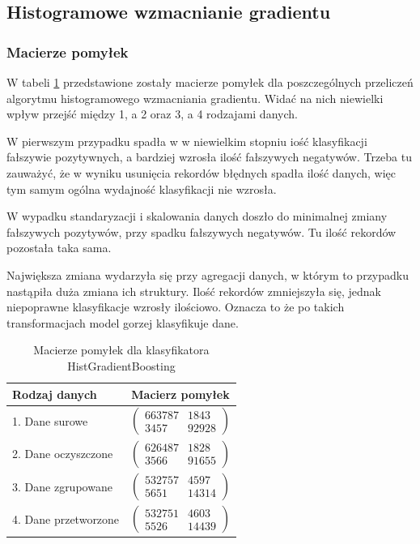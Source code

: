 \documentclass[12pt,twoside]{article}
\begin{document}
\subsection{Histogramowe wzmacnianie gradientu}

\subsubsection{Macierze pomyłek}

W tabeli \ref{tab:cm_histgradient} przedstawione zostały macierze pomyłek dla poszczególnych przeliczeń algorytmu histogramowego wzmacniania gradientu.
Widać na nich niewielki wpływ przejść między 1, a 2 oraz 3, a 4 rodzajami danych.

W pierwszym przypadku spadła w w niewielkim stopniu iość klasyfikacji fałszywie pozytywnych, a bardziej wzrosła ilość fałszywych negatywów.
Trzeba tu zauważyć, że w wyniku usunięcia rekordów błędnych spadła ilość danych, więc tym samym ogólna wydajność klasyfikacji nie wzrosła.

W wypadku standaryzacji i skalowania danych doszło do minimalnej zmiany fałszywych pozytywów, przy spadku fałszywych negatywów.
Tu ilość rekordów pozostała taka sama.

Największa zmiana wydarzyła się przy agregacji danych, w którym to przypadku nastąpiła duża zmiana ich struktury.
Ilość rekordów zmniejszyła się, jednak niepoprawne klasyfikacje wzrosły ilościowo.
Oznacza to że po takich transformacjach model gorzej klasyfikuje dane.

\begin{table}[ht]
\caption{Macierze pomyłek dla klasyfikatora HistGradientBoosting}
\centering
\renewcommand{\arraystretch}{1.3}
\begin{tabular}{|l|c|}
\hline
\textbf{Rodzaj danych} & \textbf{Macierz pomyłek} \\
\hline
1. Dane surowe & $\begin{pmatrix} 663787 & 1843 \\ 3457 & 92928 \end{pmatrix}$ \\
\hline
2. Dane oczyszczone & $\begin{pmatrix} 626487 & 1828 \\ 3566 & 91655 \end{pmatrix}$ \\
\hline
3. Dane zgrupowane& $\begin{pmatrix} 532757 & 4597 \\ 5651 & 14314 \end{pmatrix}$ \\
\hline
4. Dane przetworzone & $\begin{pmatrix} 532751 & 4603 \\ 5526 & 14439 \end{pmatrix}$ \\
\hline
\end{tabular}
\label{tab:cm_histgradient}
\end{table}
\end{document}
